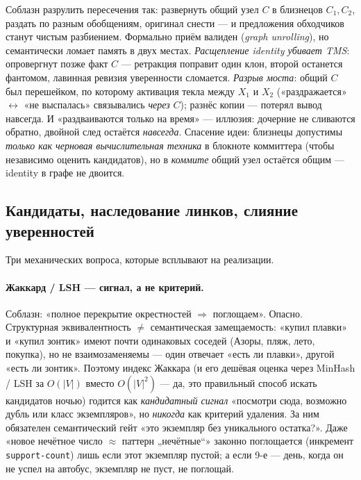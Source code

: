 \begin{pitfall}
Соблазн разрулить пересечения так: развернуть общий узел $C$ в близнецов
$C_1, C_2$, раздать по разным обобщениям, оригинал снести --- и предложения
обходчиков станут чистым разбиением. Формально приём валиден
(\textit{graph unrolling}), но семантически ломает память в двух местах.
\emph{Расщепление identity убивает TMS}: опровергнут позже факт $C$ ---
ретракция поправит один клон, второй останется фантомом, лавинная ревизия
уверенности сломается. \emph{Разрыв моста}: общий $C$ был перешейком, по
которому активация текла между $X_1$ и $X_2$ («раздражается»
$\leftrightarrow$ «не выспалась» связывались \emph{через} $C$); разнёс копии
--- потерял вывод навсегда. И «раздваиваются только на время» --- иллюзия:
дочерние не сливаются обратно, двойной след остаётся \emph{навсегда}.
Спасение идеи: близнецы допустимы \emph{только как черновая вычислительная
техника} в блокноте коммиттера (чтобы независимо оценить кандидатов), но в
\emph{коммите} общий узел остаётся общим --- identity в графе не двоится.
\end{pitfall}

\subsection{Кандидаты, наследование линков, слияние уверенностей}
\label{sec:consolidation-mechanics}

Три механических вопроса, которые всплывают на реализации.

\paragraph{Жаккард / LSH --- сигнал, а не критерий.}
Соблазн: «полное перекрытие окрестностей $\Rightarrow$ поглощаем». Опасно.
Структурная эквивалентность $\ne$ семантическая замещаемость: «купил плавки»
и «купил зонтик» имеют почти одинаковых соседей (Азоры, пляж, лето, покупка),
но не взаимозаменяемы --- один отвечает «есть ли плавки», другой «есть ли
зонтик». Поэтому индекс Жаккара (и его дешёвая оценка через
MinHash / LSH за $O(|V|)$ вместо $O(|V|^2)$ --- да, это правильный способ
искать кандидатов ночью) годится как \emph{кандидатный сигнал} «посмотри
сюда, возможно дубль или класс экземпляров», но \emph{никогда} как критерий
удаления. За ним обязателен семантический гейт «это экземпляр без
уникального остатка?». Даже «новое нечётное число $\approx$ паттерн
„нечётные“» законно поглощается (инкремент \texttt{support-count}) лишь если
этот экземпляр пустой; а если 9-е --- день, когда он не успел на автобус,
экземпляр не пуст, не поглощай.

